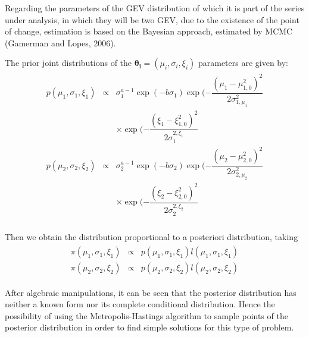 \documentclass{asaproc}
\begin{document}
Regarding the parameters of the GEV distribution of which it is part of the series under analysis, in which they will be two GEV, due to the existence of the point of change, estimation is based on the Bayesian approach, estimated by MCMC (Gamerman and Lopes, 2006).

The prior joint distributions of the $\boldsymbol{\theta_{i}} = (\mu_{i}, \sigma_{i}, \xi_{i})$ parameters are given by:
\begin{eqnarray}
\begin{array}{rcl}\label{eq3}
p(\mu_{1},\sigma_{1},\xi_{1}) & \propto & \sigma_{1}^{a-1}\exp(-b\sigma_{1})\exp(-\dfrac{(\mu_{1} - \mu_{1,0}^{2})^{2}}{2\sigma_{1,\mu_{1}}^{2}} \\
& & \times  \exp(-\dfrac{(\xi_{1} - \xi_{1,0}^{2})^{2}}{2\sigma_{1}^{2,\xi_{1}}} \nonumber \\

p(\mu_{2},\sigma_{2},\xi_{2}) & \propto & \sigma_{2}^{a-1}\exp(-b\sigma_{2})\exp(-\dfrac{(\mu_{2} - \mu_{2,0}^{2})^{2}}{2\sigma_{2,\mu_{2}}^{2}}\\
& & \times \exp(-\dfrac{(\xi_{2} - \xi_{2,0}^{2})^{2}}{2\sigma_{2}^{2,\xi_{2}}} \nonumber \\
\end{array}
\end{eqnarray}

Then we obtain the distribution proportional to a posteriori distribution, taking
\begin{eqnarray}
\begin{array}{rcl}\label{eq4}
\pi(\mu_{1},\sigma_{1},\xi_{1}) & \propto & p(\mu_{1},\sigma_{1},\xi_{1})l(\mu_{1},\sigma_{1},\xi_{1}) \nonumber \\
\pi(\mu_{2},\sigma_{2},\xi_{2}) & \propto & p(\mu_{2},\sigma_{2},\xi_{2})l(\mu_{2},\sigma_{2},\xi_{2})\nonumber 
\end{array}
\end{eqnarray}

After algebraic manipulations, it can be seen that the posterior distribution has neither a known form nor its complete conditional distribution. Hence the possibility of using the Metropolis-Hastings algorithm to sample points of the posterior distribution in order to find simple solutions for this type of problem.
\end{document}
